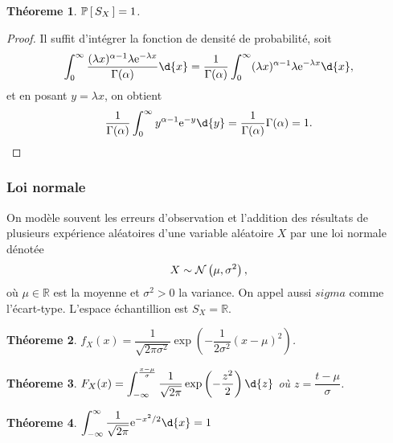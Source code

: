 \documentclass[11pt]{article}
\renewcommand\P[1]{%
	\ensuremath{%
		\mathbb{P}\left[\,#1\,\right]%
	}%
}%
\newcommand\e{%
	\ensuremath{%
		\mathrm{e}%
	}%
}%
\newcommand\Norm[2]{%
	\ensuremath{%
		\mathcal{N}\left(#1,#2\right)%
	}%
}%
\newtheorem{theoreme}{Théoreme}[section]
\begin{document}
\begin{theoreme}
	$\P{S_X}=1$.
\end{theoreme}

\begin{proof}
	Il suffit d'intégrer la fonction de densité de probabilité, soit
	\begin{equation*}
		\int_0^\infty
			\frac{(\lambda x)^{\alpha-1}\lambda\e^{-\lambda x}}{\Gamma(\alpha)}
		\d{x}=\frac{1}{\Gamma(\alpha)}\int_0^\infty
			(\lambda x)^{\alpha-1}\lambda\e^{-\lambda x}\d{x},
	\end{equation*}
	et en posant $y=\lambda x$, on obtient
	\begin{equation*}
		\frac{1}{\Gamma(\alpha)}\int_0^\infty y^{\alpha-1}\e^{-y}\d{y}
		=\frac{1}{\Gamma(\alpha)}\Gamma{(\alpha)}=1.\qedhere
	\end{equation*}
\end{proof}

\subsubsection{Loi normale}
On modèle souvent les erreurs d'observation et l'addition des résultats de
plusieurs expérience aléatoires d'une variable aléatoire $X$ par une loi
normale dénotée
\begin{equation*}
	X\sim\Norm{\mu}{\sigma^2},
\end{equation*}
où $\mu\in\mathbb{R}$ est la moyenne et $\sigma^2>0$ la variance. On appel
aussi $sigma$ comme l'écart-type. L'espace échantillion est $S_X=\mathbb{R}$.

\begin{theoreme}
	$f_X(x)=\dfrac{1}{\sqrt{2\pi\sigma^2}}\exp\left(
		{-\dfrac{1}{2\sigma^2}(x-\mu)^2}
	\right)$.
\end{theoreme}

\begin{theoreme}
	$F_X(x)=\displaystyle\int_{-\infty}^{\frac{x-\mu}{\sigma}}
		\dfrac{1}{\sqrt{2\pi}}\exp\left(-\dfrac{z^2}{2}\right)\d{z}$
	où $z=\dfrac{t-\mu}{\sigma}$.
\end{theoreme}

\begin{theoreme}
	$\displaystyle\int_{-\infty}^\infty
	\frac{1}{\sqrt{2\pi}}\e^{-x^2/2}\d{x}=1$
\end{theoreme}
\end{document}
